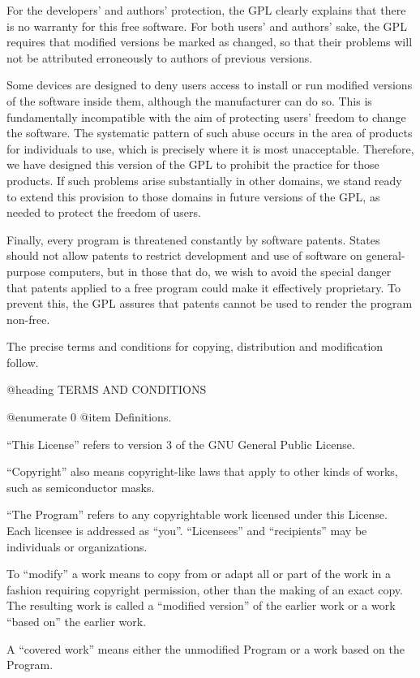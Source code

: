 For the developers' and authors' protection, the GPL clearly explains
that there is no warranty for this free software.  For both users' and
authors' sake, the GPL requires that modified versions be marked as
changed, so that their problems will not be attributed erroneously to
authors of previous versions.

Some devices are designed to deny users access to install or run
modified versions of the software inside them, although the
manufacturer can do so.  This is fundamentally incompatible with the
aim of protecting users' freedom to change the software.  The
systematic pattern of such abuse occurs in the area of products for
individuals to use, which is precisely where it is most unacceptable.
Therefore, we have designed this version of the GPL to prohibit the
practice for those products.  If such problems arise substantially in
other domains, we stand ready to extend this provision to those
domains in future versions of the GPL, as needed to protect the
freedom of users.

Finally, every program is threatened constantly by software patents.
States should not allow patents to restrict development and use of
software on general-purpose computers, but in those that do, we wish
to avoid the special danger that patents applied to a free program
could make it effectively proprietary.  To prevent this, the GPL
assures that patents cannot be used to render the program non-free.

The precise terms and conditions for copying, distribution and
modification follow.

@heading TERMS AND CONDITIONS

@enumerate 0
@item Definitions.

``This License'' refers to version 3 of the GNU General Public License.

``Copyright'' also means copyright-like laws that apply to other kinds
of works, such as semiconductor masks.

``The Program'' refers to any copyrightable work licensed under this
License.  Each licensee is addressed as ``you''.  ``Licensees'' and
``recipients'' may be individuals or organizations.

To ``modify'' a work means to copy from or adapt all or part of the work
in a fashion requiring copyright permission, other than the making of
an exact copy.  The resulting work is called a ``modified version'' of
the earlier work or a work ``based on'' the earlier work.

A ``covered work'' means either the unmodified Program or a work based
on the Program.

